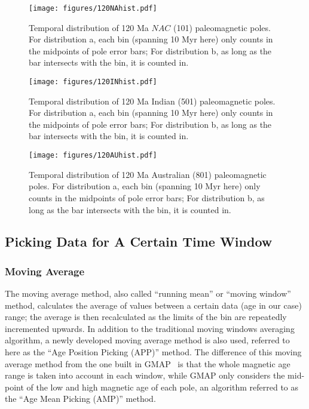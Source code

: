 \begin{figure*}
\centering
\texttt{[image: figures/120NAhist.pdf]}
\caption[Distribution of 120 Ma North American poles]{Temporal
distribution of 120 Ma $NAC$ (101) paleomagnetic poles. For
distribution a, each bin (spanning 10 Myr here) only counts in the midpoints of
pole error bars; For distribution b, as long as the bar intersects with the bin,
it is counted in.}\label{fig-120NAhist}
\end{figure*}

\begin{figure*}
\centering
\texttt{[image: figures/120INhist.pdf]}
\caption[Distribution of 120 Ma Indian poles]{Temporal distribution
of 120 Ma Indian (501) paleomagnetic poles. For distribution a, each
bin (spanning 10 Myr here) only counts in the midpoints of pole error bars; For
distribution b, as long as the bar intersects with the bin, it is counted
in.}\label{fig-120INhist}
\end{figure*}

\begin{figure*}
\centering
\texttt{[image: figures/120AUhist.pdf]}
\caption[Distribution of 120 Ma Australian poles]{Temporal
distribution of 120 Ma Australian (801) paleomagnetic poles. For
distribution a, each bin (spanning 10 Myr here) only counts in the midpoints of
pole error bars; For distribution b, as long as the bar intersects with the bin,
it is counted in.}\label{fig-120AUhist}
\end{figure*}

\subsection{Picking Data for A Certain Time Window}

\subsubsection{Moving Average}

The moving average method, also called ``running mean'' or ``moving
window''~\cite{T08} method, calculates the average of values between a certain
data (age in our case) range; the average is then recalculated as the limits of
the bin are repeatedly incremented upwards. In addition to the traditional
moving windows averaging algorithm, a newly developed moving average method is
also used, referred to here as the ``Age Position Picking (APP)'' method. The
difference of this moving average method from the one built in
GMAP~\cite{T99,T08} is that the whole magnetic age range is taken into account
in each window, while GMAP only considers the mid-point of the low and high
magnetic age of each pole, an algorithm referred to as the ``Age Mean Picking
(AMP)'' method.

